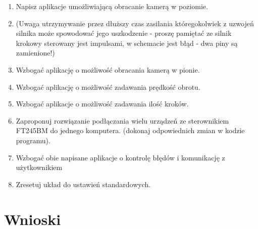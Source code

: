 \documentclass[a4paper,12pt]{extarticle}  %
\begin{document}
\begin{enumerate}
	\item Napisz aplikacje umożliwiającą obracanie kamerą w poziomie.
	\item (Uwaga utrzymywanie przez dłuższy czas zasilania któregokolwiek z uzwojeń silnika może spowodować jego uszkodzenie - proszę pamiętać ze silnik krokowy sterowany jest impulsami, w schemacie jest błąd - dwa piny są zamienione!)
	\item Wzbogać aplikację o możliwość obracania kamerą w pionie.
	\item Wzbogać aplikację o możliwość zadawania prędkość obrotu.
	\item Wzbogać aplikacje o możliwość zadawania ilość kroków.
	\item Zaproponuj rozwiązanie podłączania wielu urządzeń ze sterownikiem FT245BM do jednego komputera. (dokonaj odpowiednich zmian w kodzie programu).
	\item Wzbogać obie napisane aplikacje o kontrolę błędów i komunikację z użytkownikiem
	\item Zresetuj układ do ustawień standardowych.
\end{enumerate}
\section{Wnioski}
\end{document}
